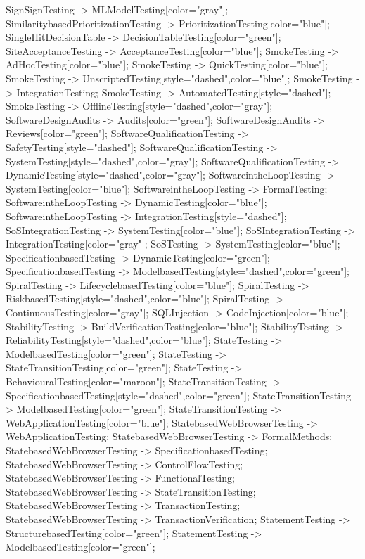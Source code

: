 \documentclass{article}
\begin{document}
{SignSignTesting -> MLModelTesting[color="gray"];
SimilaritybasedPrioritizationTesting -> PrioritizationTesting[color="blue"];
SingleHitDecisionTable -> DecisionTableTesting[color="green"];
SiteAcceptanceTesting -> AcceptanceTesting[color="blue"];
SmokeTesting -> AdHocTesting[color="blue"];
SmokeTesting -> QuickTesting[color="blue"];
SmokeTesting -> UnscriptedTesting[style="dashed",color="blue"];
SmokeTesting -> IntegrationTesting;
SmokeTesting -> AutomatedTesting[style="dashed"];
SmokeTesting -> OfflineTesting[style="dashed",color="gray"];
SoftwareDesignAudits -> Audits[color="green"];
SoftwareDesignAudits -> Reviews[color="green"];
SoftwareQualificationTesting -> SafetyTesting[style="dashed"];
SoftwareQualificationTesting -> SystemTesting[style="dashed",color="gray"];
SoftwareQualificationTesting -> DynamicTesting[style="dashed",color="gray"];
SoftwareintheLoopTesting -> SystemTesting[color="blue"];
SoftwareintheLoopTesting -> FormalTesting;
SoftwareintheLoopTesting -> DynamicTesting[color="blue"];
SoftwareintheLoopTesting -> IntegrationTesting[style="dashed"];
SoSIntegrationTesting -> SystemTesting[color="blue"];
SoSIntegrationTesting -> IntegrationTesting[color="gray"];
SoSTesting -> SystemTesting[color="blue"];
SpecificationbasedTesting -> DynamicTesting[color="green"];
SpecificationbasedTesting -> ModelbasedTesting[style="dashed",color="green"];
SpiralTesting -> LifecyclebasedTesting[color="blue"];
SpiralTesting -> RiskbasedTesting[style="dashed",color="blue"];
SpiralTesting -> ContinuousTesting[color="gray"];
SQLInjection -> CodeInjection[color="blue"];
StabilityTesting -> BuildVerificationTesting[color="blue"];
StabilityTesting -> ReliabilityTesting[style="dashed",color="blue"];
StateTesting -> ModelbasedTesting[color="green"];
StateTesting -> StateTransitionTesting[color="green"];
StateTesting -> BehaviouralTesting[color="maroon"];
StateTransitionTesting -> SpecificationbasedTesting[style="dashed",color="green"];
StateTransitionTesting -> ModelbasedTesting[color="green"];
StateTransitionTesting -> WebApplicationTesting[color="blue"];
StatebasedWebBrowserTesting -> WebApplicationTesting;
StatebasedWebBrowserTesting -> FormalMethods;
StatebasedWebBrowserTesting -> SpecificationbasedTesting;
StatebasedWebBrowserTesting -> ControlFlowTesting;
StatebasedWebBrowserTesting -> FunctionalTesting;
StatebasedWebBrowserTesting -> StateTransitionTesting;
StatebasedWebBrowserTesting -> TransactionTesting;
StatebasedWebBrowserTesting -> TransactionVerification;
StatementTesting -> StructurebasedTesting[color="green"];
StatementTesting -> ModelbasedTesting[color="green"];
}
\end{document}
